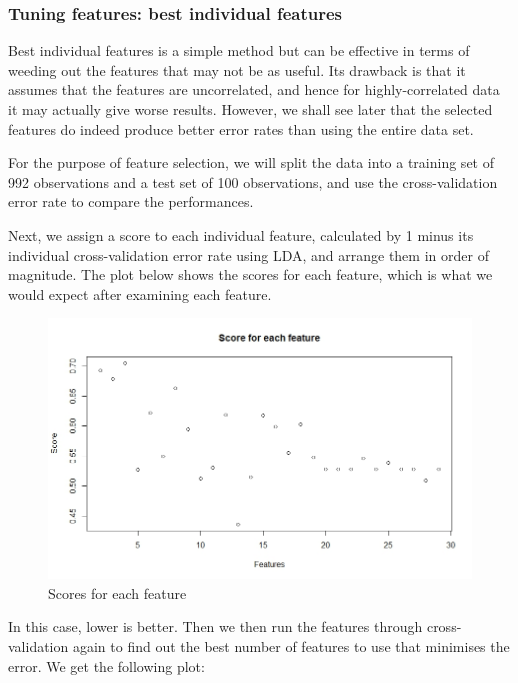 \documentclass[11pt, a4paper]{article}
\begin{document}
\subsubsection{Tuning features: best individual features}
Best individual features is a simple method but can be effective in terms of weeding out the features that may not be as useful. Its drawback is that it assumes that the features are uncorrelated, and hence for highly-correlated data it may actually give worse results. However, we shall see later that the selected features do indeed produce better error rates than using the entire data set.

For the purpose of feature selection, we will split the data into a training set of 992 observations and a test set of 100 observations, and use the cross-validation error rate to compare the performances. 

Next, we assign a score to each individual feature, calculated by 1 minus its individual cross-validation error rate using LDA, and arrange them in order of magnitude. The plot below shows the scores for each feature, which is what we would expect after examining each feature.

\begin{figure}[H]
\centering
	\includegraphics[scale=0.4]{ldacv1.jpeg}
\caption{Scores for each feature}
\end{figure}

In this case, lower is better. Then we then run the features through cross-validation again to find out the best number of features to use that minimises the error. We get the following plot:
\end{document}
